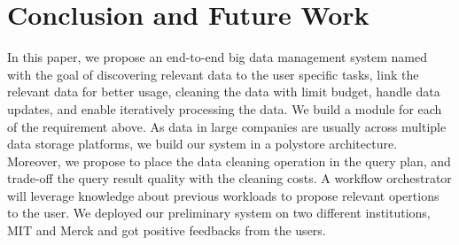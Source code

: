 \section{Conclusion and Future Work}
\label{sec:conclusion}

In this paper, we propose an end-to-end big data management system named \dcv
with the goal of discovering relevant data to the user specific tasks, link the
relevant data for better usage, cleaning the data with limit budget, handle data
updates, and enable iteratively processing the data. We build a module for each
of the requirement above. As data in large companies are usually across multiple
data storage platforms, we build our system in a polystore architecture.
Moreover, we propose to place the data cleaning operation in the query plan, and
trade-off the query result quality with the cleaning costs. A workflow orchestrator will leverage knowledge about previous workloads to propose relevant opertions to the user.
We deployed our preliminary system on two different institutions, MIT and Merck and got positive
feedbacks from the users.



